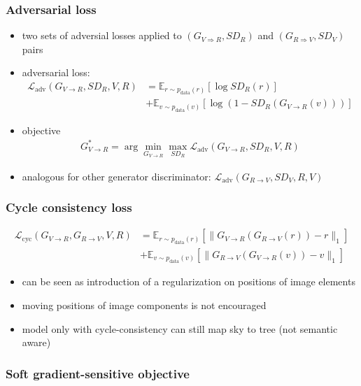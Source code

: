 \subsubsection{Adversarial loss}

\begin{itemize}
	\item two sets of adversial losses applied to $(G_{V\Rightarrow R}, SD_R)$ and $(G_{R\Rightarrow V}, SD_V)$ pairs
	\item adversarial loss:
	\begin{align}
	\mathcal{L}_{\text{adv}}(G_{V\rightarrow R}, SD_R, V, R) &= \mathbb{E}_{r\sim p_{\text{data}}(r)}[\log SD_R(r)]\\
	&+ \mathbb{E}_{v\sim p_{\text{data}}(v)}[\log(1-SD_R(G_{V\rightarrow R}(v)))]
	\end{align}
	\item objective
	\begin{align}
	G^*_{V\rightarrow R} = \arg \underset{G_{V\rightarrow R}}{\min} \underset{SD_R}{\max} \mathcal{L}_{\text{adv}}(G_{V\rightarrow R}, SD_R, V, R)
	\end{align}
	\item analogous for other generator discriminator: $\mathcal{L}_{\text{adv}}(G_{R\rightarrow V}, SD_V, R, V)$
\end{itemize}

\subsubsection{Cycle consistency loss}
\begin{align}
\mathcal{L}_{\text{cyc}}(G_{V\rightarrow R}, G_{R\rightarrow V}, V, R) &= \mathbb{E}_{r\sim p_{\text{data}}(r)}[\lVert G_{V\rightarrow R}(G_{R\rightarrow V}(r)) - r \rVert_1]\\
&+ \mathbb{E}_{v\sim p_{\text{data}}(v)}[\lVert G_{R\rightarrow V}(G_{V\rightarrow R}(v)) - v \rVert_1]
\end{align}

\begin{itemize}
	\item can be seen as introduction of a regularization on positions of image elements
	\item moving positions of image components is not encouraged
	\item model only with cycle-consistency can still map sky to tree (not semantic aware)
\end{itemize}

\subsubsection{Soft gradient-sensitive objective}

